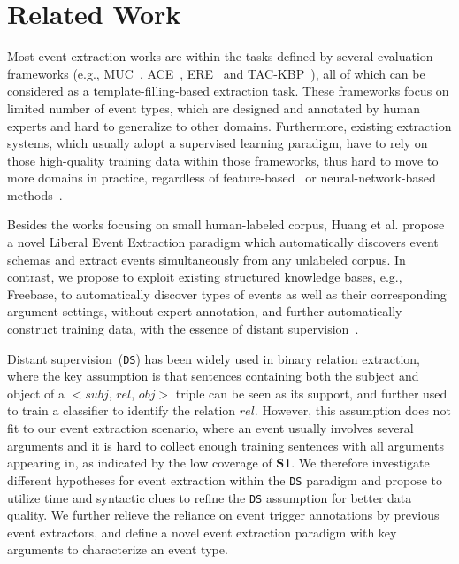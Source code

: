 \section{Related Work}
Most event extraction works are within the tasks defined by several evaluation frameworks (e.g., MUC~\cite{grishman1996message}, 
ACE~\cite{doddington2004automatic}, ERE~\cite{song2015light} and TAC-KBP~\cite{mitamura2015event}), 
all of which can be considered as a template-filling-based extraction task.
These frameworks focus on limited number of event types, which are designed and annotated by human experts and
hard to generalize to other domains.  
Furthermore, existing extraction systems, which usually adopt a supervised learning paradigm, 
have to rely on those high-quality training data within those frameworks, 
thus hard to move to more domains in practice, regardless of feature-based~\cite{gupta2009predicting,hong2011using,li2013joint} or neural-network-based methods~\cite{chen2015event,nguyen2016joint}.

Besides the works focusing on small human-labeled corpus, 
Huang et al.   propose a novel Liberal Event Extraction paradigm 
which automatically discovers event schemas and extract events simultaneously from any unlabeled corpus. 
In contrast, we propose to exploit existing structured knowledge bases, e.g., Freebase, to automatically discover 
types of events as well as their corresponding argument settings, without expert annotation, and further automatically
construct training data, with the essence of distant supervision~\cite{mintz2009distant}.

Distant supervision~(\texttt{DS}) has been widely used in binary relation extraction, where the key assumption is that 
 sentences containing both the subject and object of a $<$$subj$, $rel$, $obj$$>$ triple can be seen as its support, and further
used to train a classifier to identify the relation $rel$. However,  this assumption does not fit to our event extraction scenario, 
where an event usually involves several arguments and it is hard to collect enough training sentences with all arguments appearing in, as indicated by the low coverage of \textbf{S1}. We therefore investigate different hypotheses  for event extraction within the \texttt{DS} paradigm and propose to utilize time and syntactic clues to refine the \texttt{DS} assumption for better data quality. We further relieve the reliance on event trigger annotations by previous event extractors, and define a novel event extraction paradigm with key arguments to characterize an event type. 

